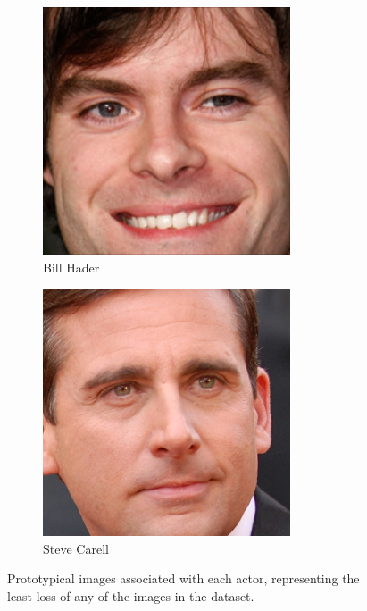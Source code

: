 \documentclass{article}
\begin{document}
\begin{figure}
\begin{subfigure}{0.5\linewidth}
		\includegraphics[width=0.75\linewidth]{most_hader}
		\caption{Bill Hader}
	\end{subfigure}%
	\begin{subfigure}{0.5\linewidth}
		\centering
		\includegraphics[width=0.75\linewidth]{most_carell}
		\caption{Steve Carell}
	\end{subfigure}
	\caption{Prototypical images associated with each actor, representing the least loss of any of the images in the dataset.}
	\label{fig:prototypical}
\end{figure}
\end{document}
